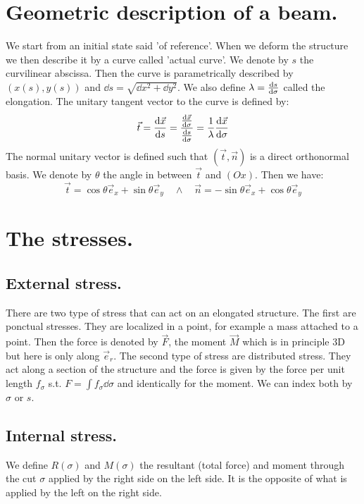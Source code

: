 \documentclass[10pt,a4paper]{book}
\begin{document}
\section{Geometric description of a beam.}
We start from an initial state said 'of reference'. When we deform the structure we then describe it by a curve called 'actual curve'. We denote by $s$ the curvilinear abscissa. Then the curve is parametrically described by $(x(s), y(s))$ and $\dd s = \sqrt{\dd x^2 + \dd y^2}$. We also define $\lambda = \dv{s}{\sigma}$ called the elongation. The unitary tangent vector to the curve is defined by:
\[
\vec{t} = \dv{\vec{x}}{s} = \frac{\dv{\vec{x}}{\sigma}}{\dv{s}{\sigma}} = \frac{1}{\lambda} \dv{\vec{x}}{\sigma}
\]
The normal unitary vector is defined such that $(\vec{t}, \vec{n})$ is a direct orthonormal basis. We denote by $\theta$ the angle in between $\vec{t}$ and $(Ox)$. Then we have:
\[
\vec{t} = \cos\theta \vec{e}_x + \sin \theta \vec{e}_y \quad \land \quad \vec{n} = -\sin \theta \vec{e}_x + \cos \theta \vec{e}_y 
\]

\section{The stresses.}
\subsection{External stress.}
There are two type of stress that can act on an elongated structure. The first are ponctual stresses. They are localized in a point, for example a mass attached to a point. Then the force is denoted by $\vec{F}$, the moment $\vec{M}$ which is in principle 3D but here is only along $\vec{e}_r$. The second type of stress are distributed stress. They act along a section of the structure and the force is given by the force per unit length $f_\sigma$ s.t. $F = \int f_\sigma \dd \sigma$ and identically for the moment. We can index both by $\sigma$ or $s$.

\subsection{Internal stress.}
We define $R(\sigma)$ and $M(\sigma)$ the resultant (total force) and moment through the cut $\sigma$ applied by the right side on the left side. It is the opposite of what is applied by the left on the right side.
\end{document}
